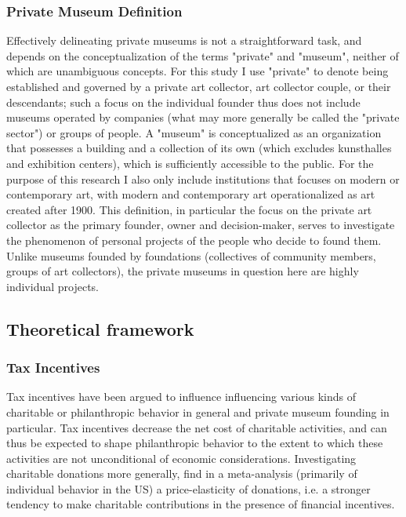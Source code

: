 \documentclass[11pt]{article}
\begin{document}
\subsubsection*{Private Museum Definition}

Effectively delineating private museums is not a straightforward task, and depends on the conceptualization of the terms "private" and "museum", neither of which are unambiguous concepts.
For this study I use "private" to denote being established and governed by a private art collector, art collector couple, or their descendants; such a focus on the individual founder thus does not include museums operated by companies (what may more generally be called the "private sector") or groups of people.
A "museum" is conceptualized as an organization that possesses a building and a collection of its own (which excludes kunsthalles and exhibition centers), which is sufficiently accessible to the public.
For the purpose of this research I also only include institutions that focuses on modern or contemporary art, with modern and contemporary art operationalized as art created after 1900.
This definition, in particular the focus on the private art collector as the primary founder, owner and decision-maker, serves to investigate the phenomenon of personal projects of the people who decide to found them.
Unlike museums founded by foundations (collectives of community members, groups of art collectors), the private museums in question here are highly individual projects.




\subsection*{Theoretical framework}




\subsubsection*{Tax Incentives}





Tax incentives have been argued to influence influencing various kinds of charitable or philanthropic behavior in general and private museum founding in particular.
Tax incentives decrease the net cost of charitable activities, and can thus be expected to shape philanthropic behavior to the extent to which these activities are not unconditional of economic considerations.
Investigating charitable donations more generally, \textcite{Peloza_Steel_2005_elasticities} find in a meta-analysis (primarily of individual behavior in the US) a price-elasticity of donations, i.e. a stronger tendency to make charitable contributions in the presence of financial incentives.
\end{document}
